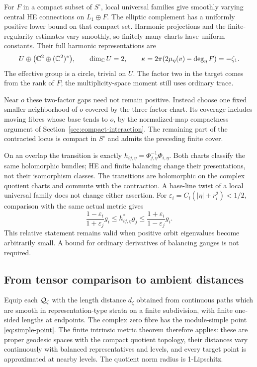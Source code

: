 For $F$ in a compact subset of $S^\circ$, local
universal families give smoothly varying central
HE connections on $L_1\oplus F$. The elliptic
complement has a uniformly positive lower bound
on that compact set. Harmonic projections and
the finite-regularity estimates vary smoothly,
so finitely many charts have uniform constants.
Their full harmonic representations are
\begin{equation}\label{eq:moving-normal-model}
 U\oplus\bigl(\mathbb C^2\oplus(\mathbb C^2)^*\bigr),
 \qquad \dim_\mathbb C U=2,
 \qquad \kappa=2\pi(2\mu_\eta(v)-\deg_\eta F)=-\zeta_1.
\end{equation}
The effective group is a circle, trivial on $U$.
The factor two in the target comes from the rank
of $F$; the multiplicity-space moment still uses
ordinary trace.

Near $o$ these two-factor gaps need not remain
positive. Instead choose one fixed smaller
neighborhood of $o$ covered by the three-factor
chart. Its coverage includes moving fibres whose
base tends to $o$, by the normalized-map
compactness argument of
Section~\ref{sec:compact-interaction}. The
remaining part of the contracted locus is compact
in $S^\circ$ and admits the preceding finite cover.

On an overlap the transition is exactly
$h_{ij,\eta}=\Phi_{j,\eta}^{-1}\Phi_{i,\eta}$.
Both charts classify the same holomorphic
bundles; HE and finite balancing change their
presentations, not their isomorphism classes.
The transitions are holomorphic on the complex
quotient charts and commute with the contraction.
A base-line twist of a local universal family
does not change either assertion.
For $\varepsilon_i=C_i(|\eta|+r_i^2)<1/2$,
comparison with the same actual metric gives
\begin{equation}\label{eq:overlap-metric}
 \frac{1-\varepsilon_i}{1+\varepsilon_j}g_i
 \le h_{ij,\eta}^*g_j
 \le\frac{1+\varepsilon_i}{1-\varepsilon_j}g_i.
\end{equation}
This relative statement remains valid when
positive orbit eigenvalues become arbitrarily
small. A bound for ordinary derivatives of
balancing gauges is not required.

\subsection{From tensor comparison to ambient distances}
Equip each $\mathcal Q_\zeta$ with the length distance
$d_\zeta$ obtained from continuous paths which
are smooth in representation-type strata on a
finite subdivision, with finite one-sided
lengths at endpoints. The complex zero fibre
has the module-simple point
\eqref{eq:simple-point}. The finite intrinsic
metric theorem \cite[Section~5]{wuebben14}
therefore applies: these are proper geodesic
spaces with the compact quotient topology,
their distances vary continuously with balanced
representatives and levels, and every target
point is approximated at nearby levels.
The quotient norm radius is 1-Lipschitz.

